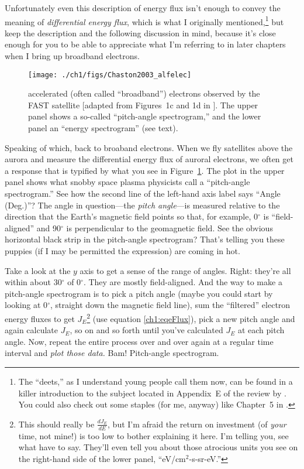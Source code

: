 Unfortunately even this description of energy flux isn't enough to
convey the meaning of \emph{differential energy flux}, which is what I
originally mentioned,\footnote{The ``deets,'' as I understand young
  people call them now, can be found in a killer introduction to the
  subject located in Appendix~E of the review by
  \citet{Bruno2013}. You could also check out some staples (for me,
  anyway) like Chapter~5 in \citet{Paschmann1998}.} but keep the
description and the following discussion in mind, because it's close
enough for you to be able to appreciate what I'm referring to in later
chapters when I bring up broadband electrons.


\begin{figure}
  \centering
  \noindent\texttt{[image: ./ch1/figs/Chaston2003\_alfelec]}
  \caption[\Alfically accelerated (broadband) electrons]{\Alfically
    accelerated (often called ``broadband'') electrons observed by
    the FAST satellite [adapted from Figures~1c and 1d in
    \citealp{Chaston2003a}]. The upper panel shows a so-called
    ``pitch-angle spectrogram,'' and the lower panel an ``energy
    spectrogram'' (see text).}
  \label{ch1:FigAlfElec}
\end{figure}


Speaking of which, back to broaband electrons. When we fly satellites
above the aurora and measure the differential energy flux of auroral
electrons, we often get a response that is typified by what you see in
Figure~\ref{ch1:FigAlfElec}. The plot in the upper panel shows what
snobby space plasma physicists call a ``pitch-angle spectrogram.''
See how the second line of the left-hand axis label says ``Angle
(Deg.)''?  The angle in question---the \emph{pitch angle}---is
measured relative to the direction that the Earth's magnetic field
points so that, for example, 0$^\circ$ is ``field-aligned'' and
90$^\circ$ is perpendicular to the geomagnetic field. See the obvious
horizontal black strip in the pitch-angle spectrogram? That's telling
you these puppies (if I may be permitted the expression) are coming in
hot.

Take a look at the $y$ axis to get a sense of the range of
angles. Right: they're all within about 30$^\circ$ of 0$^\circ$. They
are mostly field-aligned. And the way to make a pitch-angle
spectrogram is to pick a pitch angle (maybe you could start by looking
at 0$^\circ$, straight down the magnetic field line), sum the
``filtered'' electron energy fluxes to get $J_E$\footnote{This should
  really be $\frac{dJ_E}{dE}$, but I'm afraid the return on investment
  (of \emph{your} time, not mine!) is too low to bother explaining it
  here. I'm telling you, see what \citet{Bruno2013} have to
  say. They'll even tell you about those atrocious units you see on
  the right-hand side of the lower panel, ``eV/cm$^2$-s-sr-eV.''} (use
equation \ref{ch1:eqeFlux}), pick a new pitch angle and again
calculate $J_E$, so on and so forth until you've calculated $J_E$ at
each pitch angle. Now, repeat the entire process over and over again
at a regular time interval and \emph{plot those data.} Bam!
Pitch-angle spectrogram.

